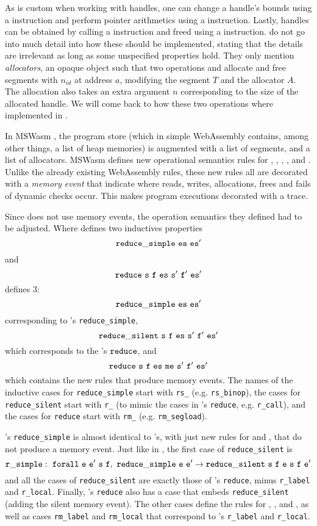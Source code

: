 \documentclass[a4paper]{article}
\begin{document}
As is custom when working with handles, one can change a handle's bounds using a \xxWslice instruction and perform pointer arithmetics using a \xxWhandleadd instruction. Lastly, handles can be obtained by calling a \xxWsegalloc instruction and freed using a \xxWsegfree instruction. \citet{mswasm} do not go into much detail into how these should be implemented, stating that the details are irrelevant as long as some unspecified properties hold. They only mention \emph{allocators}, an opaque object such that two operations  and  allocate and free segments with \xxWid \( n_{id} \) at address \( a \), modifying the segment \( T \) and the allocator \( A \). The allocation also takes an extra argument \( n \) corresponding to the size of the allocated handle. We will come back to how these two operations where implemented in \irismswasm.

In MSWasm \cite{mswasm}, the program store (which in simple WebAssembly contains, among other things, a list of heap memories) is augmented with a list of segments, and a list of allocators. MSWasm defines new operational semantics rules for \xxWsegload, \xxWsegstore, \xxWslice, \xxWhandleadd, \xxWsegalloc and \xxWsegfree. Unlike the already existing WebAssembly rules, these new rules all are decorated with a \emph{memory event} that indicate where reads, writes, allocations, frees and fails of dynamic checks occur. This makes program executions decorated with a trace.

Since \iriswasm \cite{iriswasm} does not use memory events, the operation semantics they defined had to be adjusted. Where \iriswasm defines two inductives properties \[ \tt reduce\_simple~es~es' \] and \[ \tt reduce~s~f~es~s'~f'~es' \] \irismswasm defines 3: \[ \tt reduce\_simple~es~es' \] corresponding to \iriswasm's {\tt reduce\_simple}, \[ \tt reduce\_silent~s~f~es~s'~f'~es' \] which corresponds to the \iriswasm's \( \tt reduce \), and \[ \tt reduce~s~f~es~me~s'~f'~es' \] which contains the new rules that produce memory events. The names of the inductive cases for {\tt reduce\_simple} start with {\tt rs\_} (e.g. {\tt rs\_binop}), the cases for {\tt reduce\_silent} start with {\tt r\_} (to mimic the cases in \iriswasm's {\tt reduce}, e.g. {\tt r\_call}), and the cases for {\tt reduce} start with {\tt rm\_} (e.g. {\tt rm\_segload}).


\irismswasm's {\tt reduce\_simple} is almost identical to \iriswasm's, with just new rules for \xxWhandleadd and \xxWslice, that do not produce a memory event. Just like in \iriswasm, the first case of {\tt reduce\_silent} is \[ \tt r\_simple:~forall~e~e'~s~f,~reduce\_simple~e~e'\to reduce\_silent~s~f~e~s~f~e' \] and all the cases of {\tt reduce\_silent} are exactly those of \iriswasm's {\tt reduce}, minus {\tt r\_label} and {\tt r\_local}. Finally, \irismswasm's {\tt reduce} also has a case that embeds {\tt reduce\_silent} (adding the silent \xxCMEempty memory event). The other cases define the rules for \xxWsegload, \xxWsegstore, \xxWsegalloc and \xxWsegfree, as well as cases {\tt rm\_label} and {\tt rm\_local} that correspond to \iriswasm's {\tt r\_label} and {\tt r\_local}.
\end{document}
